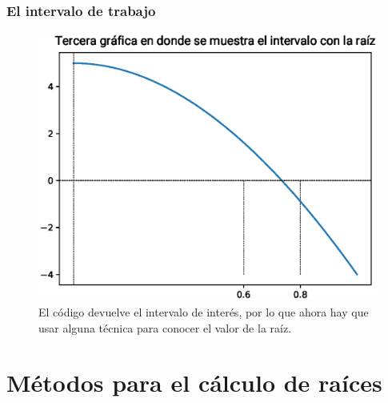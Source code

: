 \begin{frame}
\frametitle{El intervalo de trabajo}
\begin{figure}
	\centering
	\includegraphics[scale=0.5]{Imagenes/aprox_sucesivas_03.eps}
	\caption{El código devuelve el intervalo de interés, por lo que ahora hay que usar alguna técnica para conocer el valor de la raíz.} 
\end{figure}
\end{frame}
\section{Métodos para el cálculo de raíces}
